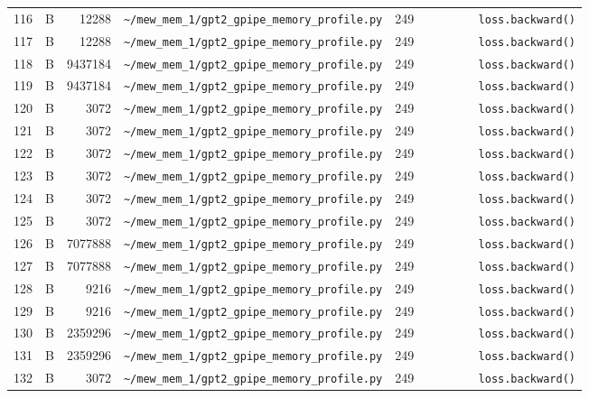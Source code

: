 \documentclass{article}
\begin{document}
\begin{longtable}{r l r p{6.5cm} r p{7.0cm}}
116 & B & 12288 & \lstinline|~/mew_mem_1/gpt2_gpipe_memory_profile.py| & 249 & \lstinline|        loss.backward()| \\
117 & B & 12288 & \lstinline|~/mew_mem_1/gpt2_gpipe_memory_profile.py| & 249 & \lstinline|        loss.backward()| \\
118 & B & 9437184 & \lstinline|~/mew_mem_1/gpt2_gpipe_memory_profile.py| & 249 & \lstinline|        loss.backward()| \\
119 & B & 9437184 & \lstinline|~/mew_mem_1/gpt2_gpipe_memory_profile.py| & 249 & \lstinline|        loss.backward()| \\
120 & B & 3072 & \lstinline|~/mew_mem_1/gpt2_gpipe_memory_profile.py| & 249 & \lstinline|        loss.backward()| \\
121 & B & 3072 & \lstinline|~/mew_mem_1/gpt2_gpipe_memory_profile.py| & 249 & \lstinline|        loss.backward()| \\
122 & B & 3072 & \lstinline|~/mew_mem_1/gpt2_gpipe_memory_profile.py| & 249 & \lstinline|        loss.backward()| \\
123 & B & 3072 & \lstinline|~/mew_mem_1/gpt2_gpipe_memory_profile.py| & 249 & \lstinline|        loss.backward()| \\
124 & B & 3072 & \lstinline|~/mew_mem_1/gpt2_gpipe_memory_profile.py| & 249 & \lstinline|        loss.backward()| \\
125 & B & 3072 & \lstinline|~/mew_mem_1/gpt2_gpipe_memory_profile.py| & 249 & \lstinline|        loss.backward()| \\
126 & B & 7077888 & \lstinline|~/mew_mem_1/gpt2_gpipe_memory_profile.py| & 249 & \lstinline|        loss.backward()| \\
127 & B & 7077888 & \lstinline|~/mew_mem_1/gpt2_gpipe_memory_profile.py| & 249 & \lstinline|        loss.backward()| \\
128 & B & 9216 & \lstinline|~/mew_mem_1/gpt2_gpipe_memory_profile.py| & 249 & \lstinline|        loss.backward()| \\
129 & B & 9216 & \lstinline|~/mew_mem_1/gpt2_gpipe_memory_profile.py| & 249 & \lstinline|        loss.backward()| \\
130 & B & 2359296 & \lstinline|~/mew_mem_1/gpt2_gpipe_memory_profile.py| & 249 & \lstinline|        loss.backward()| \\
131 & B & 2359296 & \lstinline|~/mew_mem_1/gpt2_gpipe_memory_profile.py| & 249 & \lstinline|        loss.backward()| \\
132 & B & 3072 & \lstinline|~/mew_mem_1/gpt2_gpipe_memory_profile.py| & 249 & \lstinline|        loss.backward()| \\

\end{longtable}
\end{document}
